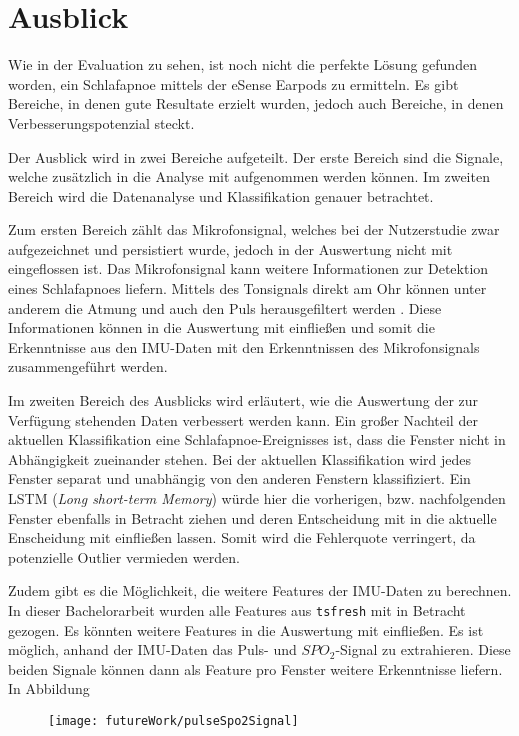 
\chapter{Ausblick}
\label{ch:FutureWork}
%

Wie in der Evaluation zu sehen, ist noch nicht die perfekte Lösung gefunden worden, ein Schlafapnoe mittels der eSense Earpods zu ermitteln.
Es gibt Bereiche, in denen gute Resultate erzielt wurden, jedoch auch Bereiche, in denen Verbesserungspotenzial steckt. 

Der Ausblick wird in zwei Bereiche aufgeteilt.
Der erste Bereich sind die Signale, welche zusätzlich in die Analyse mit aufgenommen werden können.
Im zweiten Bereich wird die Datenanalyse und Klassifikation genauer betrachtet.

Zum ersten Bereich zählt das Mikrofonsignal, welches bei der Nutzerstudie zwar aufgezeichnet und persistiert wurde, jedoch in der Auswertung nicht mit eingeflossen ist. 
Das Mikrofonsignal kann weitere Informationen zur Detektion eines Schlafapnoes liefern. 
Mittels des Tonsignals direkt am Ohr können unter anderem die Atmung und auch den Puls herausgefiltert werden \cite{nomaWearableDataAcquisition2005}.
Diese Informationen können in die Auswertung mit einfließen und somit die Erkenntnisse aus den IMU-Daten mit den Erkenntnissen des Mikrofonsignals zusammengeführt werden.

Im zweiten Bereich des Ausblicks wird erläutert, wie die Auswertung der zur Verfügung stehenden Daten verbessert werden kann.
Ein großer Nachteil der aktuellen Klassifikation eine Schlafapnoe-Ereignisses ist, dass die Fenster nicht in Abhängigkeit zueinander stehen. 
Bei der aktuellen Klassifikation wird jedes Fenster separat und unabhängig von den anderen Fenstern klassifiziert.
Ein LSTM (\textit{Long short-term Memory}) würde hier die vorherigen, bzw. nachfolgenden Fenster ebenfalls in Betracht ziehen und deren Entscheidung mit in die aktuelle Enscheidung mit einfließen lassen. 
Somit wird die Fehlerquote verringert, da potenzielle Outlier vermieden werden.

Zudem gibt es die Möglichkeit, die weitere Features der IMU-Daten zu berechnen.
In dieser Bachelorarbeit wurden alle Features aus \texttt{tsfresh} mit in Betracht gezogen. 
Es könnten weitere Features in die Auswertung mit einfließen.
Es ist möglich, anhand der IMU-Daten das Puls- und $SPO_2$-Signal zu extrahieren. 
Diese beiden Signale können dann als Feature pro Fenster weitere Erkenntnisse liefern.
In Abbildung 
\begin{figure}[ht]
    \centering
    \texttt{[image: futureWork/pulseSpo2Signal]}
    \label{futureWork:pulseSpo2}
    \caption{}
\end{figure}


